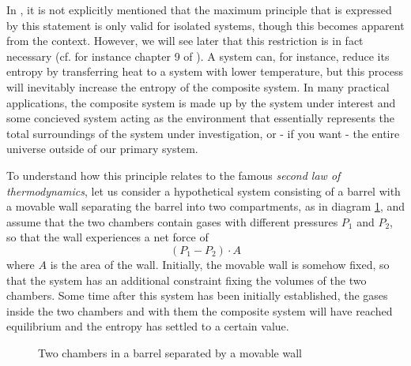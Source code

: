 \documentclass[a4paper, draft]{article}
\theoremstyle{own}
\theoremstyle{remark}
\begin{document}
In \cite{Callen}, it is not explicitly mentioned that the maximum principle that is expressed by this statement is only valid for isolated systems, though this becomes apparent from the context. However, we will see later that this restriction is in fact necessary (cf. for instance chapter 9 of \cite{Sweden}). A system can, for instance, reduce its entropy by transferring heat to a system with lower temperature, but this process will inevitably increase the entropy of the composite system. In many practical applications, the composite system is made up by the system under interest and some concieved system acting as the environment that essentially represents the total surroundings of the system under investigation, or - if you want - the entire universe outside of our primary system.

To understand how this principle relates to the famous {\em second law of thermodynamics}, let us consider a hypothetical system consisting of a barrel with a movable wall separating the barrel into two compartments, as in diagram \ref{fig:MovableWall}, and assume that the two chambers contain gases with different pressures $P_1$ and $P_2$, so that the wall experiences a net force of
$$
(P_1 - P_2) \cdot A
$$ 
where $A$ is the area of the wall. Initially, the movable wall is somehow fixed, so that the system has an additional constraint fixing the volumes of the two chambers. Some time after this system has been initially established, the gases inside the two chambers and with them the composite system will have reached equilibrium and the entropy has settled to a certain value. 

\begin{figure}[ht]
	\begin{center}
	\end{center}
	\caption{Two chambers in a barrel separated by a movable wall}
	\label{fig:MovableWall}
\end{figure}
\end{document}
